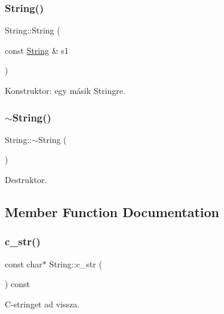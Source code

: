 \subsubsection{\texorpdfstring{String()}{String()}\hspace{0.1cm}{\footnotesize\ttfamily [4/4]}}
{\footnotesize\ttfamily String\+::\+String (\begin{DoxyParamCaption}\item[{const \mbox{\hyperlink{class_string}{String}} \&}]{s1 }\end{DoxyParamCaption})}



Konstruktor\+: egy másik Stringre. 

\mbox{\label{class_string_ac40b2a3fb58c2d8556f5e6ff73510036}} 
\subsubsection{\texorpdfstring{$\sim$String()}{~String()}}
{\footnotesize\ttfamily String\+::$\sim$\+String (\begin{DoxyParamCaption}{ }\end{DoxyParamCaption})\hspace{0.3cm}{\ttfamily [inline]}}



Destruktor. 



\subsection{Member Function Documentation}
\mbox{\label{class_string_a0274f3e61533d15086816fb7f47ccb54}} 
\subsubsection{\texorpdfstring{c\_str()}{c\_str()}}
{\footnotesize\ttfamily const char$\ast$ String\+::c\+\_\+str (\begin{DoxyParamCaption}{ }\end{DoxyParamCaption}) const\hspace{0.3cm}{\ttfamily [inline]}}



C-\/stringet ad vissza. 

